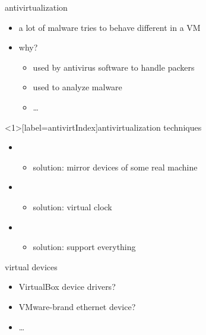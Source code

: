 \begin{frame}{antivirtualization}
    \begin{itemize}
    \item a lot of malware tries to behave different in a VM
    \vspace{.5cm}
    \item why?
        \begin{itemize}
        \item used by antivirus software to handle packers
        \item used to analyze malware
        \item \ldots
        \end{itemize}
    \end{itemize}
\end{frame}


\begin{frame}<1>[label=antivirtIndex]{antivirtualization techniques}
    \begin{itemize}
    \item {}
        \begin{itemize}
        \item<3-> solution: mirror devices of some real machine
        \end{itemize}
    \item {}
        \begin{itemize}
        \item<5-> solution: virtual clock
        \end{itemize}
    \item {}
        \begin{itemize}
        \item<7-> solution: support everything
        \end{itemize}
    \end{itemize}
\end{frame}


\begin{frame}{virtual devices}
    \begin{itemize}
    \item VirtualBox device drivers?
    \item VMware-brand ethernet device?
    \item \ldots
    \end{itemize}
\end{frame}

